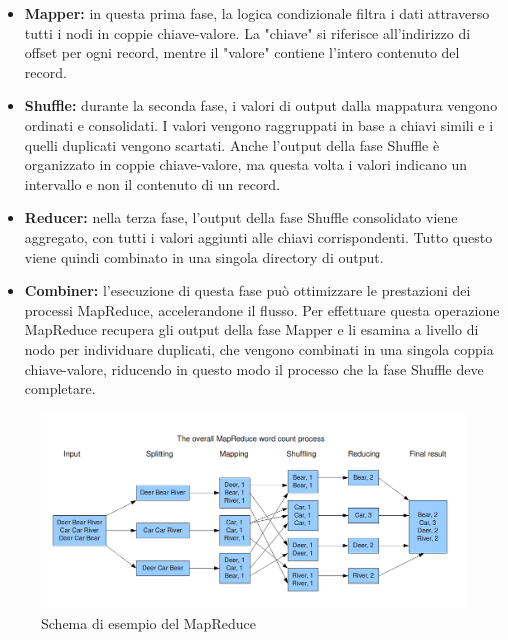 \documentclass{article}
\begin{document}
    \begin{itemize}
        \item
        \textbf{Mapper:} in questa prima fase, la logica condizionale filtra i dati attraverso tutti i nodi in coppie chiave-valore. La "chiave" si riferisce all'indirizzo di offset per ogni record, mentre il "valore" contiene l’intero contenuto del record.
        
        \item
        \textbf{Shuffle:} durante la seconda fase, i valori di output dalla mappatura vengono ordinati e consolidati. I valori vengono raggruppati in base a chiavi simili e i quelli duplicati vengono scartati. Anche l’output della fase Shuffle è organizzato in coppie chiave-valore, ma questa volta i valori indicano un intervallo e non il contenuto di un record.
        
        \item
        \textbf{Reducer:} nella terza fase, l'output della fase Shuffle consolidato viene aggregato, con tutti i valori aggiunti alle chiavi corrispondenti. Tutto questo viene quindi combinato in una singola directory di output.
        
        \item
        \textbf{Combiner:} l'esecuzione di questa fase può ottimizzare le prestazioni dei processi MapReduce, accelerandone il flusso. Per effettuare questa operazione MapReduce recupera gli output della fase Mapper e li esamina a livello di nodo per individuare duplicati, che vengono combinati in una singola coppia chiave-valore, riducendo in questo modo il processo che la fase Shuffle deve completare.
    \end{itemize}
    
    \begin{figure}[h!]
        \centering
        \includegraphics[width=\linewidth]{Schema MapReduce.png}
        \caption{Schema di esempio del MapReduce}
    \end{figure}
    
\end{document}
